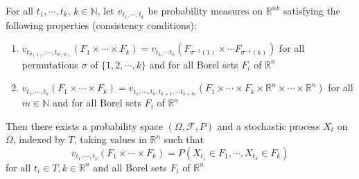 \documentclass[12pt]{article}
\begin{document}
For all $t_1,\cdots,t_k$, $k\in \mathbb{N}$, let $v_{t_1,\cdots,t_k}$ be probability measures on $\mathbb{R}^{nk}$ satisfying the following properties (consistency conditions):
\begin{enumerate}
\item $v_{t_{\sigma(1)},\cdots,t_{\sigma(k)}}(F_1\times \cdots \times F_k)=v_{t_1,\cdots t_k}(F_{\sigma^{-1}(1)}\times \cdots F_{\sigma^{-1}(k)})$ for all permutations $\sigma$ of $\lbrace 1,2,\cdots,k\rbrace$ and for all Borel sets $F_i$ of $\mathbb{R}^n$
\item $v_{t_1,\cdots,t_k}(F_1 \times \cdots \times F_k)=v_{t_1,\cdots,t_k,t_{k+1},\cdots t_{k+m}}(F_1 \times \cdots \times F_k \times \mathbb{R}^n \times \cdots \times \mathbb{R}^n)$ for all $m \in \mathbb{N}$ and for all Borel sets $F_i$ of $\mathbb{R}^n$
\end{enumerate}

Then there exists a probability space $(\Omega,\mathcal{F},P)$ and a stochastic process $X_t$ on $\Omega$, indexed by $T$, taking values in $\mathbb{R}^n$ such that 
$$ v_{t_1,\cdots,t_k}(F_1 \times \cdots \times F_k)=P(X_{t_1}\in F_1, \cdots, X_{t_k}\in F_k)$$ for all $t_i\in T, k \in \mathbb{R}^n$ and all Borel sets $F_i$ of $\mathbb{R}^n$
\end{document}
